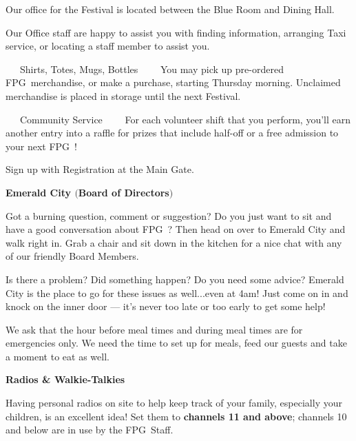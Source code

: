 \documentclass[9pt,twoside,openright,final,article]{memoir}
\def\fpg{{\beltanefamily FPG\ }}
\renewcommand{\subsection}[1]{%
  \vspace{6pt}%
  \needspace{1.25in}%
  \begin{center}\textbf{\Large \beltanefamily #1}\end{center}

  \nopagebreak}
\renewcommand{\subsubsection}[1]{%
  \vspace{1pt}\needspace{1.5in}
  {\large ~~~\beltanefamily #1~~~\ }
  \nopagebreak}
\begin{document}
\begin{multicols}{2}
  Our office for the Festival is located between the Blue Room and
  Dining Hall.

  Our Office staff are happy to assist you with finding information,
  arranging Taxi service, or locating a staff member to assist you.

  \subsubsection{Shirts, Totes, Mugs, Bottles} You may pick up
  pre-ordered \fpg merchandise, or make a purchase, starting Thursday
  morning. Unclaimed merchandise is placed in storage until the next
  Festival.


  \subsubsection{Community Service} For each volunteer shift that you
  perform, you'll earn another entry into a raffle for prizes that
  include half-off or a free admission to your next \fpg!

  Sign up with Registration at the Main Gate.


  \subsection{Emerald City  {\small $($Board of Directors$)$}}

  Got a burning question, comment or suggestion?  Do you just want to
  sit and have a good conversation about \fpg?  Then head on over to
  Emerald City and walk right in.  Grab a chair and sit down in the
  kitchen for a nice chat with any of our friendly Board Members.

  Is there a problem?  Did something happen?  Do you need some advice?
  Emerald City is the place to go for these issues as well...even at
  4am!  Just come on in and knock on the inner door --- it's never too
  late or too early to get some help!

  {\footnotesize We ask that the hour before meal times and during meal times
    are for emergencies only.  We need the time to set up for meals,
    feed our guests and take a moment to eat as well.}

  \subsection{Radios \& Walkie-Talkies}

  Having personal radios on site to help keep track of your family,
  especially your children, is an excellent idea! Set them to
  \textbf{channels 11 and above}; channels 10 and below are in use by
  the \fpg Staff.


\end{multicols}
\end{document}
